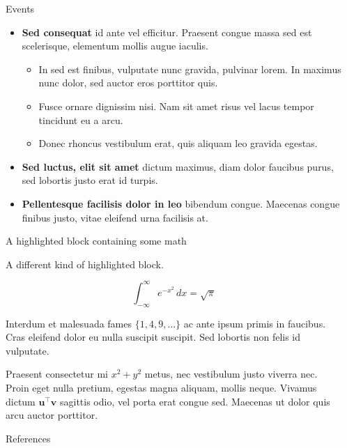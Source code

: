 \documentclass[final]{beamer}
\newlength{\sepwidth}
\newlength{\colwidth}
\newcommand{\separatorcolumn}{\begin{column}{\sepwidth}\end{column}}
\begin{document}
\begin{frame}[t]
\begin{columns}[t]
\begin{column}{\colwidth}
\begin{block}{Events}
    \begin{itemize}
      \item \textbf{Sed consequat} id ante vel efficitur. Praesent congue massa
        sed est scelerisque, elementum mollis augue iaculis.
        \begin{itemize}
          \item In sed est finibus, vulputate
            nunc gravida, pulvinar lorem. In maximus nunc dolor, sed auctor eros
            porttitor quis.
          \item Fusce ornare dignissim nisi. Nam sit amet risus vel lacus
            tempor tincidunt eu a arcu.
          \item Donec rhoncus vestibulum erat, quis aliquam leo
            gravida egestas.
        \end{itemize}
      \item \textbf{Sed luctus, elit sit amet} dictum maximus, diam dolor
        faucibus purus, sed lobortis justo erat id turpis.
      \item \textbf{Pellentesque facilisis dolor in leo} bibendum congue.
        Maecenas congue finibus justo, vitae eleifend urna facilisis at.
    \end{itemize}

  \end{block}


  \begin{exampleblock}{A highlighted block containing some math}

    A different kind of highlighted block.

    $$
    \int_{-\infty}^{\infty} e^{-x^2}\,dx = \sqrt{\pi}
    $$

    Interdum et malesuada fames $\{1, 4, 9, \ldots\}$ ac ante ipsum primis in
    faucibus. Cras eleifend dolor eu nulla suscipit suscipit. Sed lobortis non
    felis id vulputate.


    Praesent consectetur mi $x^2 + y^2$ metus, nec vestibulum justo viverra
    nec. Proin eget nulla pretium, egestas magna aliquam, mollis neque. Vivamus
    dictum $\mathbf{u}^\intercal\mathbf{v}$ sagittis odio, vel porta erat
    congue sed. Maecenas ut dolor quis arcu auctor porttitor.

  \end{exampleblock}

  \begin{block}{References}

    \nocite{*}
    \footnotesize{}

  \end{block}

\end{column}

\separatorcolumn

\end{columns}
\end{frame}
\end{document}
